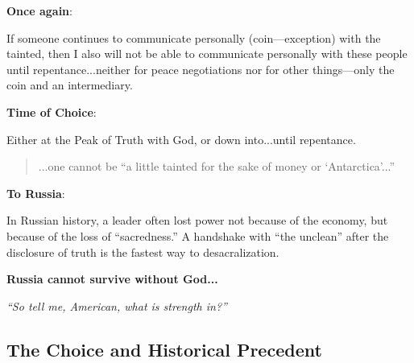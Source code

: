\documentclass[11pt,a4paper]{article}
\theoremstyle{definition}
\theoremstyle{remark}
\begin{document}
\begin{center}
\end{center}

\textbf{Once again}:

If someone continues to communicate personally (coin—exception) with the tainted, then I also will not be able to communicate personally with these people until repentance...neither for peace negotiations nor for other things—only the coin and an intermediary.

\textbf{Time of Choice}:

Either at the Peak of Truth with God, or down into...until repentance.

\begin{quote}
...one cannot be ``a little tainted for the sake of money or `Antarctica'...''
\end{quote}

\textbf{To Russia}:

In Russian history, a leader often lost power not because of the economy, but because of the loss of ``sacredness.'' A handshake with ``the unclean'' after the disclosure of truth is the fastest way to desacralization.

\textbf{Russia cannot survive without God...}

\begin{center}
\textit{``So tell me, American, what is strength in?''}
\end{center}

\subsection{The Choice and Historical Precedent}
\end{document}
